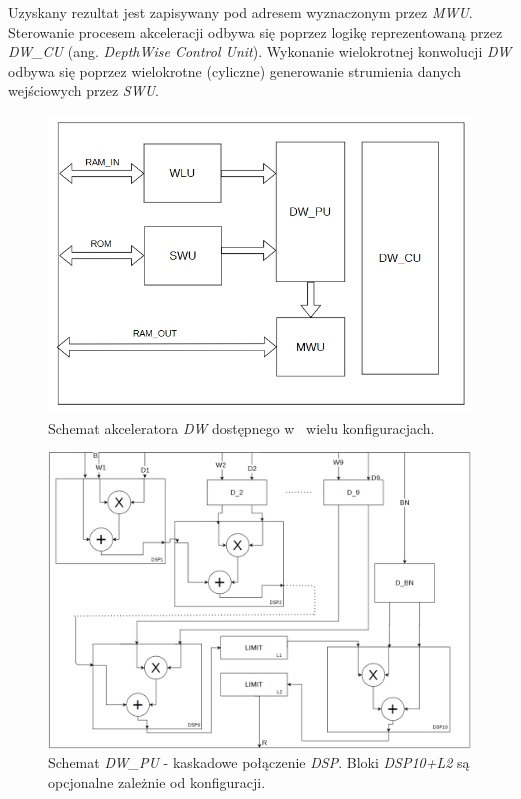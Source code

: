 Uzyskany rezultat jest zapisywany pod adresem wyznaczonym przez \emph{MWU}.
Sterowanie procesem akceleracji odbywa się poprzez logikę reprezentowaną przez \emph{DW\_CU} (ang. \emph{DepthWise Control Unit}).
Wykonanie wielokrotnej konwolucji \emph{DW} odbywa się poprzez wielokrotne (cyliczne) generowanie strumienia danych wejściowych przez \emph{SWU}.
\begin{figure}
    \centering
    \includegraphics[width=0.9\linewidth]{images/DWACC.png}
    \caption{Schemat akceleratora \emph{DW} dostępnego w~ wielu konfiguracjach.}
    \label{fig:dwacc}
\end{figure}
\begin{figure}
    \centering
    \includegraphics[width=0.9\linewidth]{images/DW_PU.png}
    \caption{Schemat \emph{DW\_PU} - kaskadowe połączenie \emph{DSP}.
    Bloki \emph{DSP10+L2} są opcjonalne zależnie od konfiguracji.}
    \label{fig:dwpu}
\end{figure}

